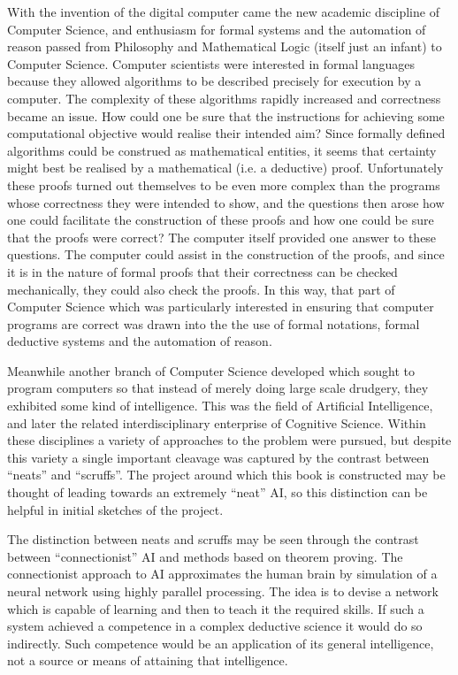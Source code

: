 With the invention of the digital computer came the new academic
discipline of Computer Science, and enthusiasm for formal systems and
the automation of reason passed from Philosophy and Mathematical Logic
(itself just an infant) to Computer Science.
Computer scientists were interested in formal languages because they
allowed algorithms to be described precisely for execution by a computer.
The complexity of these algorithms rapidly increased and correctness
became an issue.
How could one be sure that the instructions for achieving some
computational objective would realise their intended aim?
Since formally defined algorithms could be construed as mathematical
entities, it seems that certainty might best be realised by a
mathematical (i.e. a deductive) proof.
Unfortunately these proofs turned out themselves to be even more
complex than the programs whose correctness they were intended to
show, and the questions then arose how one could facilitate the
construction of these proofs and how one could be sure that the proofs
were correct?
The computer itself provided one answer to these questions.
The computer could assist in the construction of the proofs, and since
it is in the nature of formal proofs that their correctness can be
checked mechanically, they could also check the proofs.
In this way, that part of Computer Science which was particularly
interested in ensuring that computer programs are correct was drawn
into the the use of formal notations, formal deductive systems and the
automation of reason.

Meanwhile another branch of Computer Science developed which sought to
program computers so that instead of merely doing large scale
drudgery, they exhibited some kind of intelligence.
This was the field of Artificial Intelligence, and later the related
interdisciplinary enterprise of Cognitive Science.
Within these disciplines a variety of approaches to the problem were
pursued, but despite this variety a single important cleavage was
captured by the contrast between ``neats'' and ``scruffs''.
The project around which this book is constructed may be thought of
leading towards an extremely ``neat'' AI, so this distinction can be
helpful in initial sketches of the project.

The distinction between neats and scruffs may be seen through the
contrast between ``connectionist'' AI and methods based on theorem proving.
The connectionist approach to AI approximates the human brain by
simulation of a neural network using highly parallel processing.
The idea is to devise a network which is capable of learning and then
to teach it the required skills.
If such a system achieved a competence in a complex deductive science
it would do so indirectly.
Such competence would be an application of its general intelligence,
not a source or means of attaining that intelligence.

